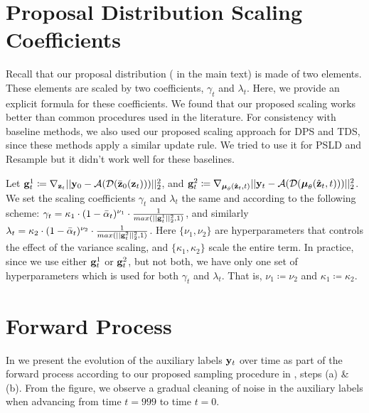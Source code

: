 \section{Proposal Distribution Scaling Coefficients}
\label{sec:scaling_coefs}
Recall that our proposal distribution ( in the main text) is made of two elements. These elements are scaled by two coefficients, $\gamma_t$ and $\lambda_t$. Here, we provide an explicit formula for these coefficients. We found that our proposed scaling works better than common procedures used in the literature. For consistency with baseline methods, we also used our proposed scaling approach for DPS and TDS, since these methods apply a similar update rule. We tried to use it for PSLD and Resample but it didn't work well for these baselines.

Let ${\mathbf{g}}_t^1 \coloneqq \nabla_{{\mathbf{z}}_t}||{\mathbf{y}}_0 -{\mathcal{A}}({\mathcal{D}}(\bar{{\mathbf{z}}}_0({\mathbf{z}}_t)))||_2^2$, and ${\mathbf{g}}_t^2 \coloneqq \nabla_{\boldsymbol{\mathbf{\mu}}_\theta(\hat{{\mathbf{z}}}_t, t)}||{\mathbf{y}}_t - {\mathcal{A}}({\mathcal{D}}(\boldsymbol{\mathbf{\mu}}_\theta(\hat{{\mathbf{z}}}_t, t)))||_2^2$.
We set the scaling coefficients $\gamma_t$ and $\lambda_t$ the same and according to the following scheme: $\gamma_t = \kappa_1 \cdot (1 - \bar{\alpha}_t)^{\nu_1} \cdot \frac{1}{max(||{\mathbf{g}}_t^1||_2^2, 1)}$, and similarly $\lambda_t = \kappa_2 \cdot (1 - \bar{\alpha}_t)^{\nu_2} \cdot \frac{1}{max(||{\mathbf{g}}_t^2||_2^2, 1)}$. Here $\{\nu_1, \nu_2\}$ are hyperparameters that controls the effect of the variance scaling, and $\{\kappa_1, \kappa_2\}$ scale the entire term. In practice, since we use either ${\mathbf{g}}_t^1$ or ${\mathbf{g}}_t^2$, but not both, we have only one set of hyperparameters which is used for both $\gamma_t$ and $\lambda_t$. That is, $\nu_1 \coloneqq \nu_2$ and $\kappa_1 \coloneqq \kappa_2$.


\section{Forward Process}
In  we present the evolution of the auxiliary labels ${\mathbf{y}}_t$ over time as part of the forward process according to our proposed sampling procedure in , steps (a) \& (b). From the figure, we observe a gradual cleaning of noise in the auxiliary labels when advancing from time $t=999$ to time $t=0$. 


